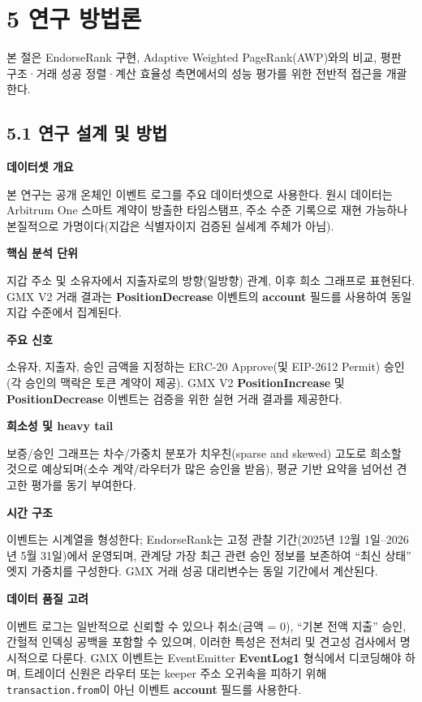 \clearpage
{}
\section*{5 \textbf{연구 방법론}}
\label{sec:research-methodology}

본 절은 EndorseRank 구현, Adaptive Weighted PageRank(AWP)와의 비교, 평판 구조·거래 성공 정렬·계산 효율성 측면에서의 성능 평가를 위한 전반적 접근을 개괄한다.


\subsection*{5.1 연구 설계 및 방법}
\label{sec:research-design-and-method}

\textbf{데이터셋 개요}


본 연구는 공개 온체인 이벤트 로그를 주요 데이터셋으로 사용한다. 원시 데이터는 Arbitrum One 스마트 계약이 방출한 타임스탬프, 주소 수준 기록으로 재현 가능하나 본질적으로 가명이다(지갑은 식별자이지 검증된 실세계 주체가 아님).


\textbf{핵심 분석 단위}


지갑 주소 및 소유자에서 지출자로의 방향(일방향) 관계, 이후 희소 그래프로 표현된다. GMX V2 거래 결과는 \textbf{PositionDecrease} 이벤트의 \textbf{account} 필드를 사용하여 동일 지갑 수준에서 집계된다.


\textbf{주요 신호}


소유자, 지출자, 승인 금액을 지정하는 ERC-20 Approve(및 EIP-2612 Permit) 승인(각 승인의 맥락은 토큰 계약이 제공). GMX V2 \textbf{PositionIncrease} 및 \textbf{PositionDecrease} 이벤트는 검증을 위한 실현 거래 결과를 제공한다.


\textbf{희소성 및 heavy tail}


보증/승인 그래프는 차수/가중치 분포가 치우친(sparse and skewed) 고도로 희소할 것으로 예상되며(소수 계약/라우터가 많은 승인을 받음), 평균 기반 요약을 넘어선 견고한 평가를 동기 부여한다.


\textbf{시간 구조}


이벤트는 시계열을 형성한다; EndorseRank는 고정 관찰 기간(2025년 12월 1일--2026년 5월 31일)에서 운영되며, 관계당 가장 최근 관련 승인 정보를 보존하여 ``최신 상태'' 엣지 가중치를 구성한다. GMX 거래 성공 대리변수는 동일 기간에서 계산된다.


\textbf{데이터 품질 고려}


이벤트 로그는 일반적으로 신뢰할 수 있으나 취소(금액 = 0), ``기본 전액 지출'' 승인, 간헐적 인덱싱 공백을 포함할 수 있으며, 이러한 특성은 전처리 및 견고성 검사에서 명시적으로 다룬다. GMX 이벤트는 EventEmitter \textbf{EventLog1} 형식에서 디코딩해야 하며, 트레이더 신원은 라우터 또는 keeper 주소 오귀속을 피하기 위해 \texttt{transaction.from}이 아닌 이벤트 \textbf{account} 필드를 사용한다.


